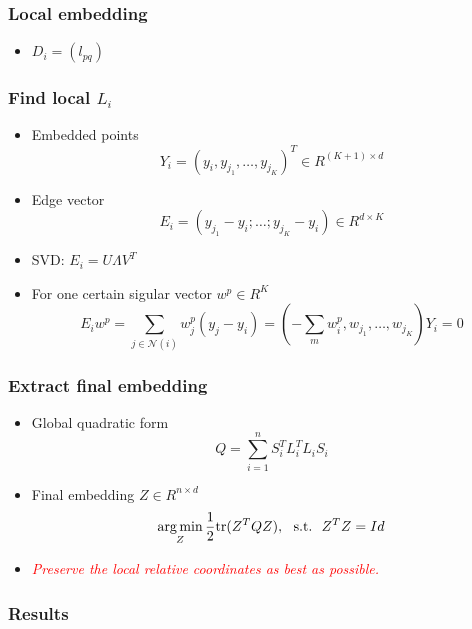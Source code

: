 \documentclass[serif,mathserif, 12pt]{beamer}
\newcommand{\TODO}[1]{\textcolor{red}{#1}}
\newcommand{\argmin}{\operatornamewithlimits{arg\min}}
\begin{document}
\begin{frame}
  \frametitle{Local embedding}
  \begin{itemize}
  \item $D_i = (l_{pq})$
  \end{itemize}
\end{frame}

\begin{frame}
  \frametitle{Find local $L_i$}
  \begin{itemize}
  \item Embedded points
    \begin{equation*}
      Y_i = (y_i, y_{j_1}, \dots, y_{j_K})^T \in R^{(K+1)\times d}
    \end{equation*}
  \item Edge vector
    \begin{equation*}
      E_i = (y_{j_1}-y_i; \dots; y_{j_K}-y_i) \in R^{d\times K}
    \end{equation*}
  \item SVD: $E_i = U\Lambda V^T$
  \item For one certain sigular vector $w^p \in R^K$
    \begin{equation*}
      E_i w^p = \sum_{j\in \mathcal{N}(i)} w^p_j(y_{j}-y_i) = (-\sum_m w^p_i, w_{j_1}, \dots, w_{j_K})Y_i = 0
    \end{equation*}
  \end{itemize}
\end{frame}

\begin{frame}
  \frametitle{Extract final embedding}
  \begin{itemize}
  \item Global quadratic form
    \begin{equation*}
      Q = \sum_{i = 1}^n S_i^TL_i^TL_iS_i
    \end{equation*}
  \item Final embedding $Z \in R^{n\times d}$
    \begin{equation*}
      \argmin_Z \frac{1}{2}\text{tr}(Z^TQZ), \text{~~s.t.~~} Z^TZ = Id
    \end{equation*}
  \item \emph{\TODO{Preserve the local relative coordinates as best as possible.}}
  \end{itemize}
\end{frame}


\begin{frame}
  \frametitle{Results}  
\end{frame}

\begin{frame} 
\end{frame}
\end{document}
